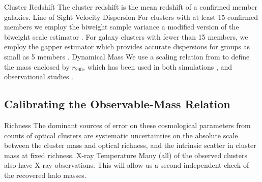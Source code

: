 \documentclass[12pt]{article}
\begin{document}
\begin{outline}[enumerate]
\begin{table}
			\label{tbl:cluster members}
		\end{table}
	\1 Cluster Redshift
		\2 The cluster redshift is the mean redshift of a confirmed member galaxies.
	\1 Line of Sight Velocity Dispersion
		\2 For clusters with at least 15 confirmed members we employ the biweight sample variance \citep{Ruel2014} a modified version of the biweight scale estimator \citep{Beers1990}.
		\2 For galaxy clusters with fewer than 15 members, we employ the gapper estimator \citep{Beers1990} which provides accurate dispersions for groups as small as 5 members \citep{Hou2009}.
	\1 Dynamical Mass
		\2 We use a scaling relation from \cite{Evrard2008,Saro2013, Munari2013} to define the mass enclosed by $r_{200c}$ which has been used in both simulations , and observational studies .
\end{outline}
\subsection{Calibrating the Observable-Mass Relation}
\begin{outline}[enumerate]
	\1 Richness
		\2 The dominant sources of error on these cosmological parameters from counts of optical clusters are systematic uncertainties on the absolute scale between the cluster mass and optical richness, and the intrinsic scatter in cluster mass at fixed richness.
	\1 X-ray Temperature
		\2 Many (all) of the observed clusters also have X-ray observations. This will allow us a second independent check of the recovered halo masses.
\end{outline}
\end{document}
